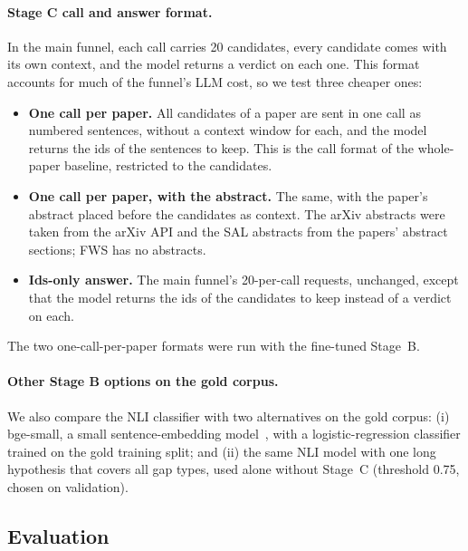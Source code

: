 \paragraph{Stage C call and answer format.} In the main funnel, each call carries 20 candidates, every candidate comes with its own context, and the model returns a verdict on each one. This format accounts for much of the funnel's LLM cost, so we test three cheaper ones:
\begin{itemize}
  \item \textbf{One call per paper.} All candidates of a paper are sent in one call as numbered sentences, without a context window for each, and the model returns the ids of the sentences to keep. This is the call format of the whole-paper baseline, restricted to the candidates.
  \item \textbf{One call per paper, with the abstract.} The same, with the paper's abstract placed before the candidates as context. The arXiv abstracts were taken from the arXiv API and the SAL abstracts from the papers' abstract sections; FWS has no abstracts.
  \item \textbf{Ids-only answer.} The main funnel's 20-per-call requests, unchanged, except that the model returns the ids of the candidates to keep instead of a verdict on each.
\end{itemize}
The two one-call-per-paper formats were run with the fine-tuned Stage~B.

\paragraph{Other Stage B options on the gold corpus.} We also compare the NLI classifier with two alternatives on the gold corpus: (i) bge-small, a small sentence-embedding model~\cite{xiao2023cpack}, with a logistic-regression classifier trained on the gold training split; and (ii) the same NLI model with one long hypothesis that covers all gap types, used alone without Stage~C (threshold 0.75, chosen on validation).

\subsection{Evaluation}

